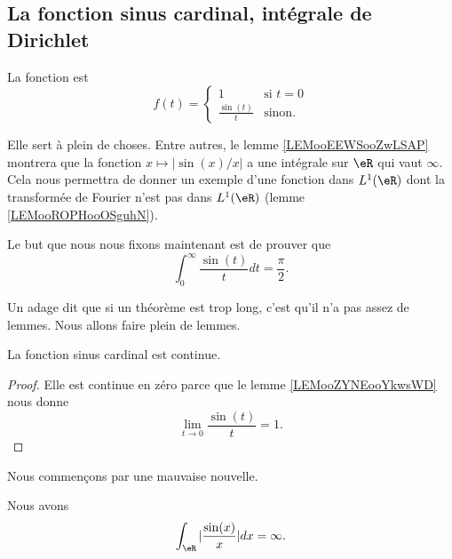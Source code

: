 \subsection{La fonction sinus cardinal, intégrale de Dirichlet}

\begin{definition}
    La fonction  est
    \begin{equation}
        f(t)=\begin{cases}
            1    &   \text{si } t=0 \\
            \frac{ \sin(t) }{ t }    &    \text{sinon. }
        \end{cases}
    \end{equation}
\end{definition}
Elle sert à plein de choses. Entre autres, le lemme \ref{LEMooEEWSooZwLSAP} montrera que la fonction \( x\mapsto | \sin(x)/x |\) a une intégrale sur \( \eR\) qui vaut \( \infty\). Cela nous permettra de donner un exemple d'une fonction dans \( L^1(\eR)\) dont la transformée de Fourier n'est pas dans \( L^1(\eR)\) (lemme \ref{LEMooROPHooOSguhN}).

\begin{normaltext}
    Le but que nous nous fixons maintenant est de prouver que
    \begin{equation}
        \int_{0}^{\infty}\frac{ \sin(t) }{ t }dt=\frac{ \pi }{2}.
    \end{equation}

    Un adage dit que si un théorème est trop long, c'est qu'il n'a pas assez de lemmes. Nous allons faire plein de lemmes.
\end{normaltext}

\begin{lemma}
    La fonction sinus cardinal est continue.
\end{lemma}

\begin{proof}
    Elle est continue en zéro parce que le lemme \ref{LEMooZYNEooYkwsWD} nous donne
    \begin{equation}
        \lim_{t\to 0}\frac{ \sin(t) }{ t }=1.
    \end{equation}
\end{proof}

Nous commençons par une mauvaise nouvelle.
\begin{lemma}           \label{LEMooEEWSooZwLSAP}
    Nous avons
    \begin{equation}
        \int_{\eR}| \frac{ \sin(x) }{ x } |dx=\infty.
    \end{equation}
\end{lemma}

